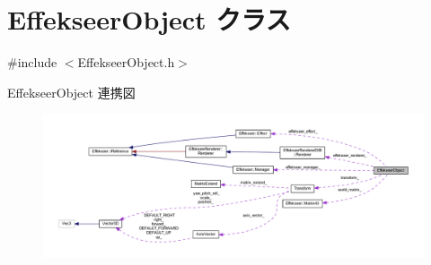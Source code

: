 \hypertarget{class_effekseer_object}{}\section{Effekseer\+Object クラス}
\label{class_effekseer_object}


{\ttfamily \#include $<$Effekseer\+Object.\+h$>$}



Effekseer\+Object 連携図\nopagebreak
\begin{figure}[H]
\begin{center}
\leavevmode
\includegraphics[width=350pt]{class_effekseer_object__coll__graph}
\end{center}
\end{figure}

